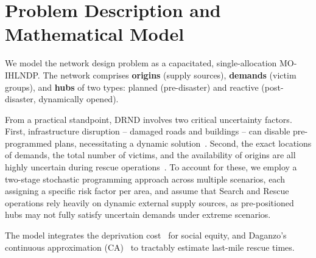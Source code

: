 \documentclass{llncs}
\begin{document}
\section{Problem Description and Mathematical Model}

We model the network design problem as a capacitated, single-allocation MO-IHLNDP. The network comprises \textbf{origins} (supply sources), \textbf{demands} (victim groups), and \textbf{hubs} of two types: planned (pre-disaster) and reactive (post-disaster, dynamically opened).

From a practical standpoint, DRND involves two critical uncertainty factors. First, infrastructure disruption -- damaged roads and buildings -- can disable pre-programmed plans, necessitating a dynamic solution~\cite{Yahyaei2019}. Second, the exact locations of demands, the total number of victims, and the availability of origins are all highly uncertain during rescue operations~\cite{tofighi2016humanitarian}. To account for these, we employ a two-stage stochastic programming approach across multiple scenarios, each assigning a specific risk factor per area, and assume that Search and Rescue operations rely heavily on dynamic external supply sources, as pre-positioned hubs may not fully satisfy uncertain demands under extreme scenarios.

The model integrates the deprivation cost~\cite{holguin2013appropriate} for social equity, and Daganzo's continuous approximation (CA)~\cite{daganzo2005logistics} to tractably estimate last-mile rescue times.
\end{document}
